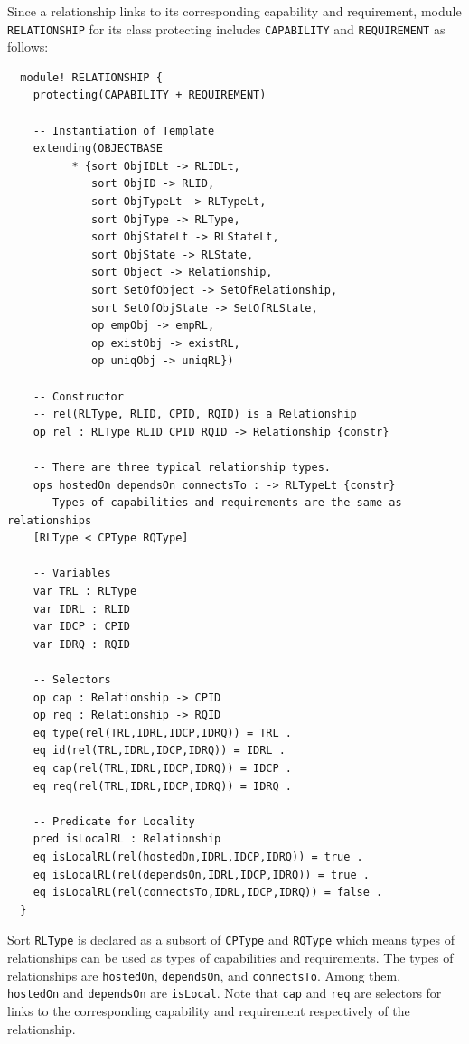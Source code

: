 \documentclass[12pt]{report}
\begin{document}
Since a relationship links to its corresponding capability and
requirement, module {\tt RELATIONSHIP} for its class protecting
includes {\tt CAPABILITY} and {\tt REQUIREMENT} as follows:
\small
\begin{verbatim}
  module! RELATIONSHIP {
    protecting(CAPABILITY + REQUIREMENT)
  
    -- Instantiation of Template
    extending(OBJECTBASE
          * {sort ObjIDLt -> RLIDLt,
             sort ObjID -> RLID,
             sort ObjTypeLt -> RLTypeLt,
             sort ObjType -> RLType,
             sort ObjStateLt -> RLStateLt,
             sort ObjState -> RLState,
             sort Object -> Relationship,
             sort SetOfObject -> SetOfRelationship,
             sort SetOfObjState -> SetOfRLState,
             op empObj -> empRL,
             op existObj -> existRL,
             op uniqObj -> uniqRL})
  
    -- Constructor
    -- rel(RLType, RLID, CPID, RQID) is a Relationship
    op rel : RLType RLID CPID RQID -> Relationship {constr}
  
    -- There are three typical relationship types.
    ops hostedOn dependsOn connectsTo : -> RLTypeLt {constr}
    -- Types of capabilities and requirements are the same as relationships
    [RLType < CPType RQType]
  
    -- Variables
    var TRL : RLType
    var IDRL : RLID
    var IDCP : CPID
    var IDRQ : RQID
  
    -- Selectors
    op cap : Relationship -> CPID
    op req : Relationship -> RQID
    eq type(rel(TRL,IDRL,IDCP,IDRQ)) = TRL .
    eq id(rel(TRL,IDRL,IDCP,IDRQ)) = IDRL .
    eq cap(rel(TRL,IDRL,IDCP,IDRQ)) = IDCP .
    eq req(rel(TRL,IDRL,IDCP,IDRQ)) = IDRQ .
  
    -- Predicate for Locality
    pred isLocalRL : Relationship
    eq isLocalRL(rel(hostedOn,IDRL,IDCP,IDRQ)) = true .
    eq isLocalRL(rel(dependsOn,IDRL,IDCP,IDRQ)) = true .
    eq isLocalRL(rel(connectsTo,IDRL,IDCP,IDRQ)) = false .
  }
\end{verbatim}
\normalsize
Sort {\tt RLType} is declared as a subsort of {\tt CPType} and {\tt RQType}
which means types of relationships can be used as types of capabilities
and requirements.
The types of relationships are {\tt hostedOn}, {\tt dependsOn}, and
{\tt connectsTo}.  Among them,\\ {\tt hostedOn} and {\tt dependsOn} are
{\tt isLocal}.  Note that {\tt cap} and {\tt req} are selectors for
links to the corresponding capability and requirement respectively of
the relationship.
\end{document}
